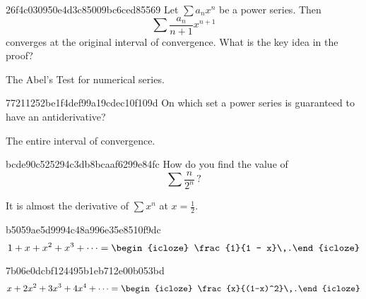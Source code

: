 \begin{note}{26f4c030950e4d3c85009bc6ced85569}
    Let \({ \sum a_n x^{n} }\) be a power series.
    Then
    \[
        \sum \frac{a_n}{n+1}x^{n+1}
    \]
    converges at the original interval of convergence.
    What is the key idea in the proof?

    \begin{cloze}{1}
        The Abel's Test for numerical series.
    \end{cloze}
\end{note}

\begin{note}{77211252be1f4def99a19cdec10f109d}
    On which set a power series is guaranteed to have an antiderivative?

    \begin{cloze}{1}
        The entire interval of convergence.
    \end{cloze}
\end{note}

\begin{note}{bcde90c525294c3db8bcaaf6299e84fc}
    How do you find the value of
    \[
        \sum \frac{n}{2^{n}}\,?
    \]

    \begin{cloze}{1}
        It is almost the derivative of \({ \sum x^{n} }\) at \({ x = \frac{1}{2} }\).
    \end{cloze}
\end{note}

\begin{note}{b5059ae5d9994c48a996e35e8510f9dc}
    \[
        1 + x + x^2 + x^3 + \cdots = \begin{icloze}{1}\frac{1}{1 - x}\,.\end{icloze}
    \]
\end{note}

\begin{note}{7b06e0dcbf124495b1eb712e00b053bd}
    \[
        x + 2x^2 + 3x^3 + 4x^4 + \cdots = \begin{icloze}{1}\frac{x}{(1-x)^2}\,.\end{icloze}
    \]
\end{note}


